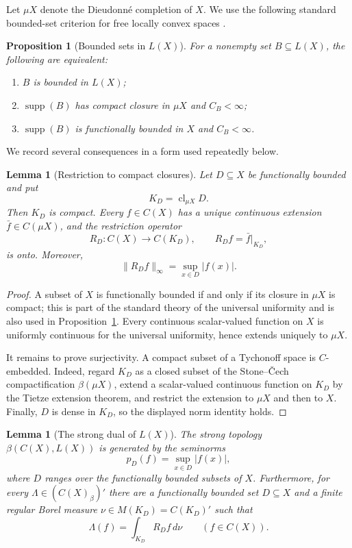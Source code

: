 \documentclass[11pt]{article}
\newtheorem{proposition}[theorem]{Proposition}
\newtheorem{lemma}[theorem]{Lemma}
\newcommand{\supp}{\operatorname{supp}}
\newcommand{\cl}{\operatorname{cl}}
\begin{document}
Let $\mu X$ denote the Dieudonn\'e completion of $X$.  We use the following
standard bounded-set criterion for free locally convex spaces
\cite[Proposition~2.7]{Gabriyelyan2019}.

\begin{proposition}[Bounded sets in $L(X)$]\label{prop:bounded}
For a nonempty set $B\subseteq L(X)$, the following are equivalent:
\begin{enumerate}[label=\textup{(\roman*)}]
\item $B$ is bounded in $L(X)$;
\item $\supp(B)$ has compact closure in $\mu X$ and $C_B<\infty$;
\item $\supp(B)$ is functionally bounded in $X$ and $C_B<\infty$.
\end{enumerate}
\end{proposition}

We record several consequences in a form used repeatedly below.

\begin{lemma}[Restriction to compact closures]\label{lem:restriction}
Let $D\subseteq X$ be functionally bounded and put
\[
  K_D=\cl_{\mu X}D.
\]
Then $K_D$ is compact.  Every $f\in C(X)$ has a unique continuous extension
$\bar f\in C(\mu X)$, and the restriction operator
\[
  R_D:C(X)\longrightarrow C(K_D),
  \qquad R_Df=\bar f|_{K_D},
\]
is onto.  Moreover,
\[
  \|R_Df\|_\infty=\sup_{x\in D}|f(x)|.
\]
\end{lemma}

\begin{proof}
A subset of $X$ is functionally bounded if and only if its closure in $\mu X$
is compact; this is part of the standard theory of the universal uniformity and
is also used in Proposition~\ref{prop:bounded}.  Every continuous scalar-valued
function on $X$ is uniformly continuous for the universal uniformity, hence
extends uniquely to $\mu X$.

It remains to prove surjectivity.  A compact subset of a Tychonoff space is
$C$-embedded.  Indeed, regard $K_D$ as a closed subset of the Stone--\v Cech
compactification $\beta(\mu X)$, extend a scalar-valued continuous function on
$K_D$ by the Tietze extension theorem, and restrict the extension to $\mu X$
and then to $X$.  Finally, $D$ is dense in $K_D$, so the displayed norm identity
holds.
\end{proof}

\begin{lemma}[The strong dual of $L(X)$]\label{lem:strongdual}
The strong topology $\beta(C(X),L(X))$ is generated by the seminorms
\[
  p_D(f)=\sup_{x\in D}|f(x)|,
\]
where $D$ ranges over the functionally bounded subsets of $X$.
Furthermore, for every
\(
  \Lambda\in(C(X)_\beta)'
\)
there are a functionally bounded set $D\subseteq X$ and a finite regular Borel
measure $\nu\in M(K_D)=C(K_D)'$ such that
\[
  \Lambda(f)=\int_{K_D}R_Df\,d\nu
  \qquad(f\in C(X)).
\]
\end{lemma}
\end{document}
